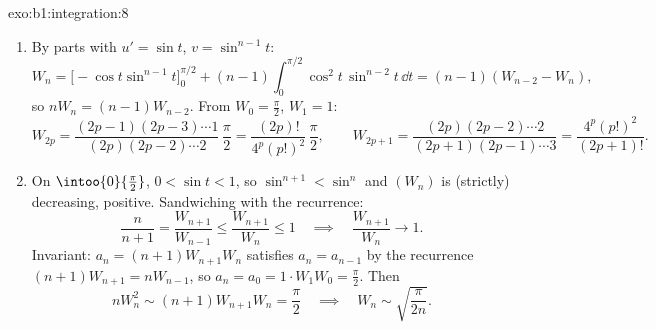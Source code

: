 \begin{solution}{exo:b1:integration:8}
\begin{enumerate}
  \item By parts with $u' = \sin t$, $v = \sin^{n-1} t$:
        \[
        W_n = \bigl[-\cos t\sin^{n-1}t\bigr]_0^{\pi/2}
        + (n-1)\int_0^{\pi/2} \cos^2 t\,\sin^{n-2} t\,\dd t
        = (n-1)(W_{n-2} - W_n),
        \]
        so $nW_n = (n-1)W_{n-2}$. From $W_0 = \frac\pi2$, $W_1 = 1$:
        \[
        W_{2p} = \frac{(2p-1)(2p-3)\cdots 1}{(2p)(2p-2)\cdots 2}\,
        \frac{\pi}{2} = \frac{(2p)!}{4^p (p!)^2}\,\frac\pi2,
        \qquad
        W_{2p+1} = \frac{(2p)(2p-2)\cdots 2}{(2p+1)(2p-1)\cdots 3}
        = \frac{4^p (p!)^2}{(2p+1)!} .
        \]
  \item On $\intoo{0}{\frac\pi2}$, $0 < \sin t < 1$, so $\sin^{n+1} <
        \sin^n$ and $(W_n)$ is (strictly) decreasing, positive.
        Sandwiching with the recurrence:
        \[
        \frac{n}{n+1} = \frac{W_{n+1}}{W_{n-1}}
        \leq \frac{W_{n+1}}{W_n} \leq 1
        \quad\implies\quad \frac{W_{n+1}}{W_n} \to 1 .
        \]
        Invariant: $a_n = (n+1)W_{n+1}W_n$ satisfies $a_n = a_{n-1}$
        by the recurrence $(n+1)W_{n+1} = nW_{n-1}$, so $a_n = a_0 =
        1 \cdot W_1 W_0 = \frac\pi2$. Then
        \[
        n W_n^2 \sim (n+1) W_{n+1} W_n = \frac\pi2
        \quad\implies\quad
        W_n \sim \sqrt{\frac{\pi}{2n}} .
        \]
\end{enumerate}
\end{solution}

